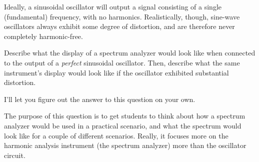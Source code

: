

Ideally, a sinusoidal oscillator will output a signal consisting of a single (fundamental) frequency, with no harmonics.  Realistically, though, sine-wave oscillators always exhibit some degree of distortion, and are therefore never completely harmonic-free.

Describe what the display of a spectrum analyzer would look like when connected to the output of a {\it perfect} sinusoidal oscillator.  Then, describe what the same instrument's display would look like if the oscillator exhibited substantial distortion.







I'll let you figure out the answer to this question on your own.







The purpose of this question is to get students to think about how a spectrum analyzer would be used in a practical scenario, and what the spectrum would look like for a couple of different scenarios.  Really, it focuses more on the harmonic analysis instrument (the spectrum analyzer) more than the oscillator circuit.





